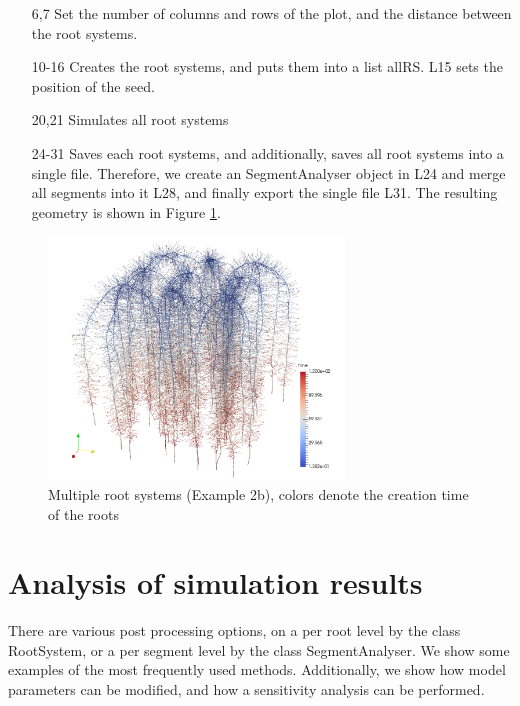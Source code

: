\documentclass[a4paper]{article}
\begin{document}
\begin{itemize}

\item[6,7] Set the number of columns and rows of the plot, and the distance between the root systems.

\item[10-16] Creates the root systems, and puts them into a list allRS. L15 sets the position of the seed. 

\item[20,21] Simulates all root systems 

\item[24-31] Saves each root systems, and additionally, saves all root systems into a single file. 
Therefore, we create an SegmentAnalyser object in L24 and merge all segments into it L28, and finally export the single file L31. The resulting geometry is shown in Figure \ref{fig:multiple}.

\end{itemize}

\begin{figure}
\centering
\includegraphics[width=0.7\textwidth]{example_2b.png}
\caption{Multiple root systems (Example 2b), colors denote the creation time of the roots} \label{fig:multiple}
\end{figure}



\section{Analysis of simulation results}

There are various post processing options, on a per root level by the class RootSystem, or a per segment level by the class SegmentAnalyser.
We show some examples of the most frequently used methods. Additionally, we show how model parameters can be modified, 
and how a sensitivity analysis can be performed. 
\end{document}
